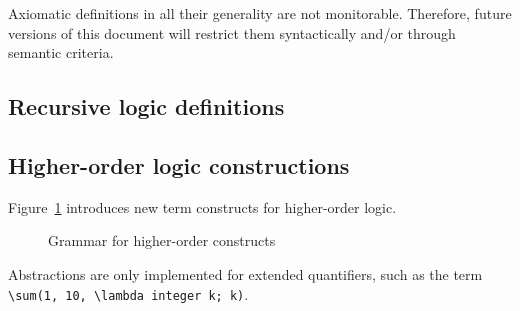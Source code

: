 Axiomatic definitions in all their generality are not monitorable. Therefore,
future versions of this document will restrict them syntactically and/or
through semantic criteria.


\subsection{}
\label{sec:polym-logic-types}
\nodiff


\subsection{Recursive logic definitions}
\nodiff


\subsection{Higher-order logic constructions}
\label{sec:higherorder}

\experimental

\nodiff

Figure~\ref{fig:gram:higherorder} introduces new term constructs for
higher-order logic.

\begin{figure}[htp]
  \begin{cadre}
      
    \end{cadre}
  \caption{Grammar for higher-order constructs}
\label{fig:gram:higherorder}
\end{figure}

{\highlightnotimplemented Abstractions are only implemented for extended
  quantifiers, such as the term \lstinline|\sum(1, 10, \lambda integer k; k)|.}


\subsection{}
\label{sec:concrete-logic-types}
\experimental

